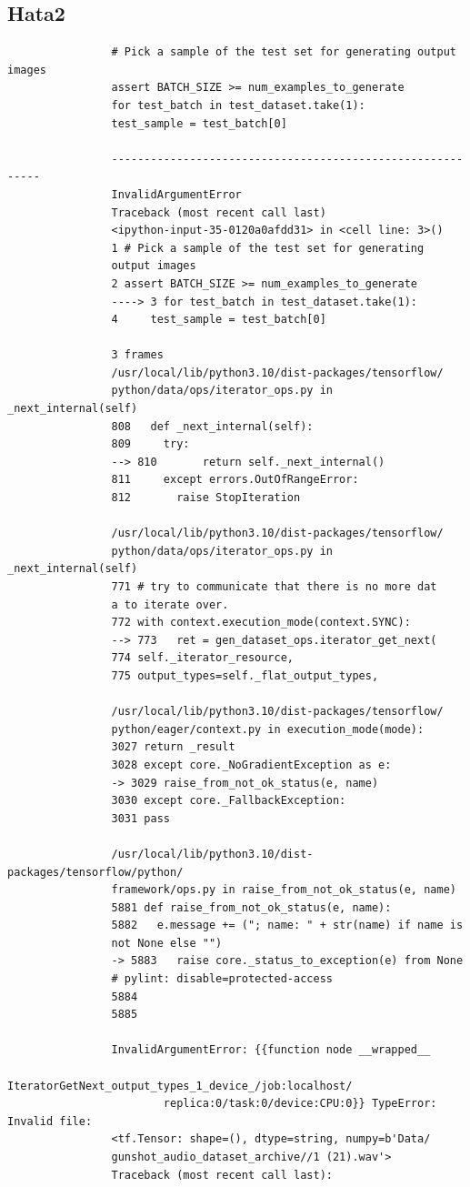 \documentclass[12pt, a4paper]{article}
\begin{document}
			\subsection{Hata2}
			\begin{verbatim}
				# Pick a sample of the test set for generating output images
				assert BATCH_SIZE >= num_examples_to_generate
				for test_batch in test_dataset.take(1):
				test_sample = test_batch[0]
				
				-----------------------------------------------------------
				InvalidArgumentError                     
				Traceback (most recent call last)
				<ipython-input-35-0120a0afdd31> in <cell line: 3>()
				1 # Pick a sample of the test set for generating 
				output images
				2 assert BATCH_SIZE >= num_examples_to_generate
				----> 3 for test_batch in test_dataset.take(1):
				4     test_sample = test_batch[0]
				
				3 frames
				/usr/local/lib/python3.10/dist-packages/tensorflow/
				python/data/ops/iterator_ops.py in _next_internal(self)
				808   def _next_internal(self):
				809     try:
				--> 810       return self._next_internal()
				811     except errors.OutOfRangeError:
				812       raise StopIteration
				
				/usr/local/lib/python3.10/dist-packages/tensorflow/
				python/data/ops/iterator_ops.py in _next_internal(self)
				771 # try to communicate that there is no more dat
				a to iterate over.
				772 with context.execution_mode(context.SYNC):
				--> 773   ret = gen_dataset_ops.iterator_get_next(
				774 self._iterator_resource,
				775 output_types=self._flat_output_types,
				
				/usr/local/lib/python3.10/dist-packages/tensorflow/
				python/eager/context.py in execution_mode(mode):
				3027 return _result
				3028 except core._NoGradientException as e:
				-> 3029 raise_from_not_ok_status(e, name)
				3030 except core._FallbackException:
				3031 pass
				
				/usr/local/lib/python3.10/dist-packages/tensorflow/python/
				framework/ops.py in raise_from_not_ok_status(e, name)
				5881 def raise_from_not_ok_status(e, name):
				5882   e.message += ("; name: " + str(name) if name is
				not None else "")
				-> 5883   raise core._status_to_exception(e) from None 
				# pylint: disable=protected-access
				5884 
				5885 
				
				InvalidArgumentError: {{function node __wrapped__
						IteratorGetNext_output_types_1_device_/job:localhost/
						replica:0/task:0/device:CPU:0}} TypeError: Invalid file: 
				<tf.Tensor: shape=(), dtype=string, numpy=b'Data/
				gunshot_audio_dataset_archive//1 (21).wav'>
				Traceback (most recent call last):
				

\end{verbatim}
\end{document}
